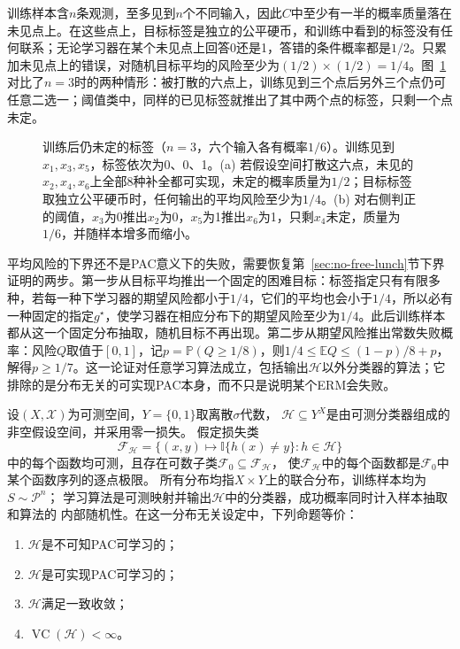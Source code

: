 训练样本含$n$条观测，至多见到$n$个不同输入，因此$C$中至少有一半的概率质量落在未见点上。在这些点上，目标标签是独立的公平硬币，和训练中看到的标签没有任何联系；无论学习器在某个未见点上回答0还是1，答错的条件概率都是$1/2$。只累加未见点上的错误，对随机目标平均的风险至少为$(1/2)\times(1/2)=1/4$。图~\ref{fig:lt5-unseen-labels-shattered}对比了$n=3$时的两种情形：被打散的六点上，训练见到三个点后另外三个点仍可任意二选一；阈值类中，同样的已见标签就推出了其中两个点的标签，只剩一个点未定。

\begin{figure}[htbp]
  \centering
  
  \caption{训练后仍未定的标签（$n=3$，六个输入各有概率$1/6$）。训练见到$x_1,x_3,x_5$，标签依次为0、0、1。(a) 若假设空间打散这六点，未见的$x_2,x_4,x_6$上全部8种补全都可实现，未定的概率质量为$1/2$；目标标签取独立公平硬币时，任何输出的平均风险至少为$1/4$。(b) 对右侧判正的阈值，$x_3$为0推出$x_2$为0，$x_5$为1推出$x_6$为1，只剩$x_4$未定，质量为$1/6$，并随样本增多而缩小。}
  \label{fig:lt5-unseen-labels-shattered}
\end{figure}

平均风险的下界还不是PAC意义下的失败，需要恢复第~\ref{sec:no-free-lunch}节下界证明的两步。第一步从目标平均推出一个固定的困难目标：标签指定只有有限多种，若每一种下学习器的期望风险都小于$1/4$，它们的平均也会小于$1/4$，所以必有一种固定的指定$g^\star$，使学习器在相应分布下的期望风险至少为$1/4$。此后训练样本都从这一个固定分布抽取，随机目标不再出现。第二步从期望风险推出常数失败概率：风险$Q$取值于$[0,1]$，记$p=\mathbb P(Q\geq1/8)$，则$1/4\leq\mathbb EQ\leq(1-p)/8+p$，解得$p\geq1/7$。这一论证对任意学习算法成立，包括输出$\mathcal H$以外分类器的算法；它排除的是分布无关的可实现PAC本身，而不只是说明某个ERM会失败。

\begin{theorem}[二分类学习基本定理]
\label{thm:binary-fundamental-theorem}
设$(X,\mathcal X)$为可测空间，$Y=\{0,1\}$取离散$\sigma$代数，
$\mathcal H\subseteq Y^X$是由可测分类器组成的非空假设空间，并采用零一损失。
假定损失类
\[
 \mathcal F_{\mathcal H}
 =\{(x,y)\mapsto\mathbb I\{h(x)\neq y\}:h\in\mathcal H\}
\]
中的每个函数均可测，且存在可数子类$\mathcal F_0\subseteq\mathcal F_{\mathcal H}$，
使$\mathcal F_{\mathcal H}$中的每个函数都是$\mathcal F_0$中某个函数序列的逐点极限。
所有分布均指$X\times Y$上的联合分布，训练样本均为$S\sim\mathcal P^n$；
学习算法是可测映射并输出$\mathcal H$中的分类器，成功概率同时计入样本抽取和算法的
内部随机性。在这一分布无关设定中，下列命题等价：
\begin{enumerate}
 \item $\mathcal H$是不可知PAC可学习的；
 \item $\mathcal H$是可实现PAC可学习的；
 \item $\mathcal H$满足一致收敛；
 \item $\operatorname{VC}(\mathcal H)<\infty$。
\end{enumerate}
\end{theorem}


